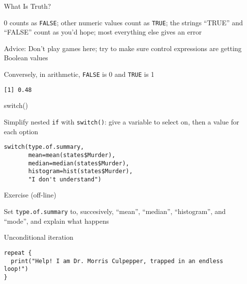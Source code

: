 \documentclass[8pt,ignorenonframetext,]{beamer}
\newenvironment{Shaded}{\begin{snugshade}}{\end{snugshade}}
\newcommand{\KeywordTok}[1]{\textcolor[rgb]{0.13,0.29,0.53}{\textbf{#1}}}
\newcommand{\DecValTok}[1]{\textcolor[rgb]{0.00,0.00,0.81}{#1}}
\newcommand{\StringTok}[1]{\textcolor[rgb]{0.31,0.60,0.02}{#1}}
\newcommand{\OperatorTok}[1]{\textcolor[rgb]{0.81,0.36,0.00}{\textbf{#1}}}
\newcommand{\NormalTok}[1]{#1}
\begin{document}
\begin{frame}[fragile]{What Is Truth?}

0 counts as \texttt{FALSE}; other numeric values count as \texttt{TRUE};
the strings ``TRUE'' and ``FALSE'' count as you'd hope; most everything
else gives an error

Advice: Don't play games here; try to make sure control expressions are
getting Boolean values

Conversely, in arithmetic, \texttt{FALSE} is 0 and \texttt{TRUE} is 1

\begin{Shaded}
\end{Shaded}

\begin{verbatim}
[1] 0.48
\end{verbatim}

\end{frame}

\begin{frame}[fragile]{switch()}

Simplify nested \texttt{if} with \texttt{switch()}: give a variable to
select on, then a value for each option

\begin{verbatim}
switch(type.of.summary,
       mean=mean(states$Murder),
       median=median(states$Murder),
       histogram=hist(states$Murder),
       "I don't understand")
\end{verbatim}

\end{frame}

\begin{frame}[fragile]{Exercise (off-line)}

Set \texttt{type.of.summary} to, succesively, ``mean'', ``median'',
``histogram'', and ``mode'', and explain what happens

\end{frame}

\begin{frame}[fragile]{Unconditional iteration}

\begin{verbatim}
repeat {
  print("Help! I am Dr. Morris Culpepper, trapped in an endless loop!")
}
\end{verbatim}

\end{frame}
\end{document}
